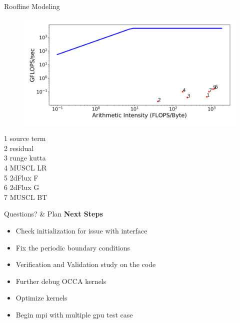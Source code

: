 \begin{frame}[t]{Roofline Modeling}
  \minipage{\textwidth}
  \begin{figure}[!htbp]
   \includegraphics[width=1.0\linewidth]{fig/rooflinemodeling}
   \centering
  \end{figure}

  \endminipage\hfill
    1 source term \\
    2 residual\\
    3 runge kutta\\
    4 MUSCL LR\\
    5 2dFlux F\\
    6 2dFlux G\\
    7 MUSCL BT
  \endminipage\hfill
  \endminipage


  \vspace{0.5cm}
\end{frame}

\begin{frame}[t,fragile]{Questions? \& Plan}
  \textbf{Next Steps}
  \begin{itemize}
    \item Check initialization for issue with interface 
    \item Fix the periodic boundary conditions
    \item Verification and Validation study on the code
    \item Further debug OCCA kernels
    \item Optimize kernels
    \item Begin mpi with multiple gpu test case
  \end{itemize}
\end{frame}

\backupbegin

